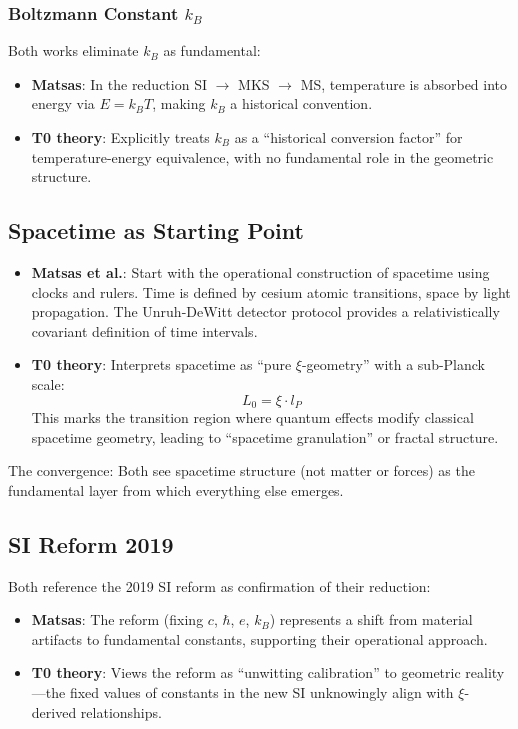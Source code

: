 	\subsubsection{Boltzmann Constant $k_B$}
	
	Both works eliminate $k_B$ as fundamental:
	
	\begin{itemize}
		\item \textbf{Matsas}: In the reduction SI $\to$ MKS $\to$ MS, temperature is absorbed into energy via $E = k_B T$, making $k_B$ a historical convention.
		
		\item \textbf{T0 theory}: Explicitly treats $k_B$ as a ``historical conversion factor'' for temperature-energy equivalence, with no fundamental role in the geometric structure.
	\end{itemize}
	
	\subsection{Spacetime as Starting Point}
	
	\begin{itemize}
		\item \textbf{Matsas et al.}: Start with the operational construction of spacetime using clocks and rulers. Time is defined by cesium atomic transitions, space by light propagation. The Unruh-DeWitt detector protocol provides a relativistically covariant definition of time intervals.
		
		\item \textbf{T0 theory}: Interprets spacetime as ``pure $\xi$-geometry'' with a sub-Planck scale:
		\[
		L_0 = \xi \cdot l_P
		\]
		This marks the transition region where quantum effects modify classical spacetime geometry, leading to ``spacetime granulation'' or fractal structure.
	\end{itemize}
	
	The convergence: Both see spacetime structure (not matter or forces) as the fundamental layer from which everything else emerges.
	
	\subsection{SI Reform 2019}
	
	Both reference the 2019 SI reform as confirmation of their reduction:
	
	\begin{itemize}
		\item \textbf{Matsas}: The reform (fixing $c$, $\hbar$, $e$, $k_B$) represents a shift from material artifacts to fundamental constants, supporting their operational approach.
		
		\item \textbf{T0 theory}: Views the reform as ``unwitting calibration'' to geometric reality—the fixed values of constants in the new SI unknowingly align with $\xi$-derived relationships.
	\end{itemize}
	
